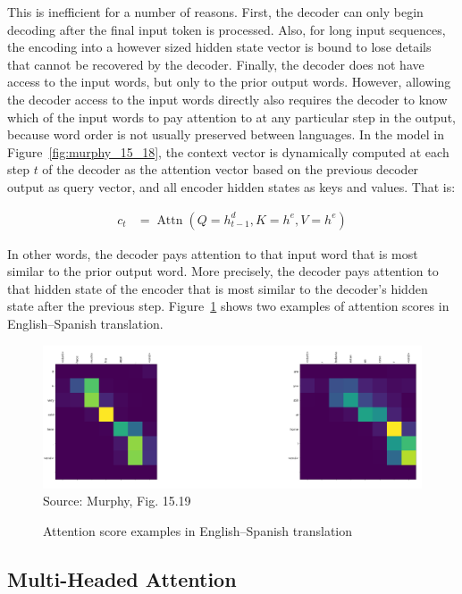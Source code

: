 This is inefficient for a number of reasons. First, the decoder can only begin decoding after the final input token is processed. Also, for long input sequences, the encoding into a however sized hidden state vector is bound to lose details that cannot be recovered by the decoder. Finally, the decoder does not have access to the input words, but only to the prior output words. However, allowing the decoder access to the input words directly also requires the decoder to know which of the input words to pay attention to at any particular step in the output, because word order is not usually preserved between languages. In the model in Figure~\ref{fig:murphy_15_18}, the context vector is dynamically computed at each step $t$ of the decoder as the attention vector based on the previous decoder output as query vector, and all encoder hidden states as keys and values. That is:

\begin{align*}
c_t &= \operatorname{Attn}(Q = h_{t-1}^d, K = h^e, V = h^e)
\end{align*}

In other words, the decoder pays attention to that input word that is most similar to the prior output word. More precisely, the decoder pays attention to that hidden state of the encoder that is most similar to the decoder's hidden state after the previous step. Figure~\ref{fig:murphy_15_19} shows two examples of attention scores in English--Spanish translation. 

\begin{figure}
\begin{center}
\includegraphics[width=\textwidth]{murphy_15_19.png} \\

\scriptsize Source: Murphy, Fig. 15.19 \normalsize
\end{center}
\caption{Attention score examples in English--Spanish translation}
\label{fig:murphy_15_19}
\end{figure}

\subsection*{Multi-Headed Attention}

